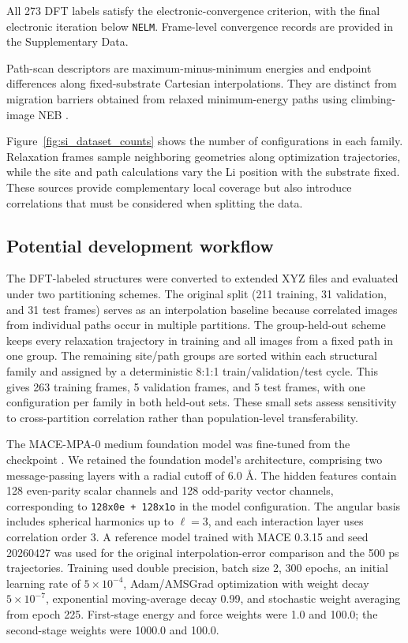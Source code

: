 \documentclass[12pt]{article}
\begin{document}
All 273 DFT labels satisfy the electronic-convergence criterion, with the final
electronic iteration below \texttt{NELM}. Frame-level convergence records are
provided in the Supplementary Data.

Path-scan descriptors are maximum-minus-minimum energies and endpoint
differences along fixed-substrate Cartesian interpolations. They are distinct
from migration barriers obtained from relaxed minimum-energy paths using
climbing-image NEB \citep{henkelman2000neb}.

Figure~\ref{fig:si_dataset_counts} shows the number of configurations in each
family. Relaxation frames sample neighboring geometries along optimization
trajectories, while the site and path calculations vary the Li position with
the substrate fixed. These sources provide complementary local coverage but
also introduce correlations that must be considered when splitting the data.



\subsection{Potential development workflow}

The DFT-labeled structures were converted to extended XYZ files and evaluated under two partitioning schemes. The original split (211 training, 31 validation, and 31 test frames) serves as an interpolation baseline because correlated images from individual paths occur in multiple partitions. The group-held-out scheme keeps every relaxation trajectory in training and all images from a fixed path in one group. The remaining site/path groups are sorted within each structural family and assigned by a deterministic 8:1:1 train/validation/test cycle. This gives 263 training frames, 5 validation frames, and 5 test frames, with one configuration per family in both held-out sets. These small sets assess sensitivity to cross-partition correlation rather than population-level transferability.

The MACE-MPA-0 medium foundation model \citep{batatia2025foundation} was fine-tuned from the checkpoint . We retained the foundation model's architecture, comprising two message-passing layers with a radial cutoff of 6.0 \AA{}. The hidden features contain 128 even-parity scalar channels and 128 odd-parity vector channels, corresponding to \texttt{128x0e + 128x1o} in the model configuration. The angular basis includes spherical harmonics up to $\ell=3$, and each interaction layer uses correlation order 3. A reference model trained with MACE 0.3.15 and seed 20260427 was used for the original interpolation-error comparison and the 500 ps trajectories. Training used double precision, batch size 2, 300 epochs, an initial learning rate of \(5\times 10^{-4}\), Adam/AMSGrad optimization with weight decay \(5\times 10^{-7}\), exponential moving-average decay 0.99, and stochastic weight averaging from epoch 225. First-stage energy and force weights were 1.0 and 100.0; the second-stage weights were 1000.0 and 100.0.
\end{document}
